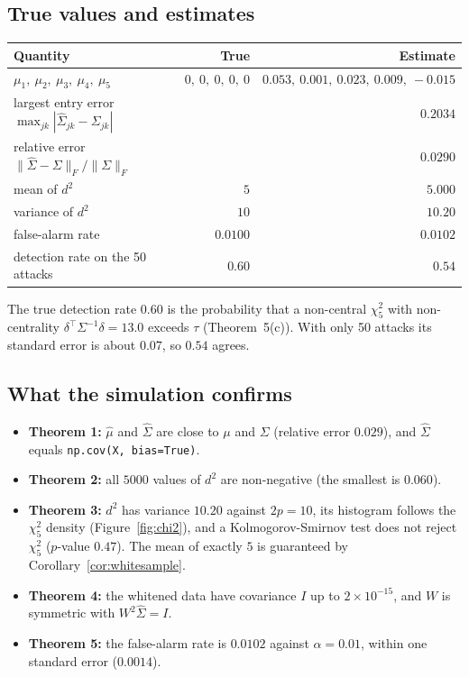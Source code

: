 \documentclass[11pt]{article}
\newcommand{\T}{^{\top}}
\newcommand{\hSigma}{\hat{\Sigma}}
\newcommand{\hmu}{\hat{\mu}}
\newcommand{\norm}[1]{\lVert #1\rVert}
\theoremstyle{plain}
\theoremstyle{definition}
\theoremstyle{remark}
\begin{document}
\subsection{True values and estimates}
\begin{table}[H]
\centering\small
\begin{tabular}{@{}lrr@{}}
\toprule
Quantity & True & Estimate\\
\midrule
$\mu_1,\ \mu_2,\ \mu_3,\ \mu_4,\ \mu_5$ & $0,\ 0,\ 0,\ 0,\ 0$ & $0.053,\ 0.001,\ 0.023,\ 0.009,\ -0.015$\\
largest entry error $\max_{jk}|\hSigma_{jk}-\Sigma_{jk}|$ & & $0.2034$\\
relative error $\norm{\hSigma-\Sigma}_F/\norm{\Sigma}_F$ & & $0.0290$\\
mean of $d^2$ & $5$ & $5.000$\\
variance of $d^2$ & $10$ & $10.20$\\
false-alarm rate & $0.0100$ & $0.0102$\\
detection rate on the 50 attacks & $0.60$ & $0.54$\\
\bottomrule
\end{tabular}
\end{table}
The true detection rate $0.60$ is the probability that a non-central $\chi^2_5$ with
non-centrality $\delta\T\Sigma^{-1}\delta=13.0$ exceeds $\tau$ (Theorem~5(c)). With only
50 attacks its standard error is about $0.07$, so $0.54$ agrees.

\subsection{What the simulation confirms}
\begin{itemize}[nosep]
\item \textbf{Theorem 1:} $\hmu$ and $\hSigma$ are close to $\mu$ and $\Sigma$ (relative
 error $0.029$), and $\hSigma$ equals \texttt{np.cov(X, bias=True)}.
\item \textbf{Theorem 2:} all $5000$ values of $d^2$ are non-negative (the smallest is $0.060$).
\item \textbf{Theorem 3:} $d^2$ has variance $10.20$ against $2p=10$, its histogram
 follows the $\chi^2_5$ density (Figure~\ref{fig:chi2}), and a Kolmogorov-Smirnov test
 does not reject $\chi^2_5$ ($p$-value $0.47$). The mean of exactly $5$ is guaranteed by
 Corollary~\ref{cor:whitesample}.
\item \textbf{Theorem 4:} the whitened data have covariance $I$ up to $2\times10^{-15}$,
 and $W$ is symmetric with $W^2\hSigma=I$.
\item \textbf{Theorem 5:} the false-alarm rate is $0.0102$ against $\alpha=0.01$,
 within one standard error ($0.0014$).
\end{itemize}
\end{document}
